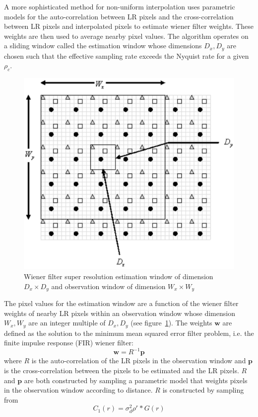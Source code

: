 A more sophisticated method for non-uniform interpolation uses parametric models for the auto-correlation between LR pixels and the cross-correlation between LR pixels and interpolated pixels to estimate wiener filter weights.
%
These weights are then used to average nearby pixel values.
%
The algorithm operates on a sliding window called the estimation window whose dimensions $D_x, D_y$ are chosen such that the effective sampling rate exceeds the Nyquist rate for a given $\rho_c$.
\begin{figure}
    \centering
    \includegraphics[width=.7\linewidth]{figures/wiener.png}
    \caption{Wiener filter super resolution estimation window of dimension $D_x \times D_y$ and observation window of dimension $W_x \times W_y$\cite{wiener}}
    \label{fig:wiener}
\end{figure}
The pixel values for the estimation window are a function of the wiener filter weights of nearby LR pixels within an observation window whose dimension $W_x, W_y$ are an integer multiple of $D_x, D_y$ (see figure~\ref{fig:wiener}).
%
The weights $\bm{w}$ are defined as the solution to the minimum mean squared error filter problem, i.e. the finite impulse response (FIR) wiener filter:
\begin{equation}
    \bm{w} = R^{-1}\bm{p}
\end{equation}
where $R$ is the auto-correlation of the LR pixels in the observation window and $\bm{p}$ is the cross-correlation between the pixels to be estimated and the LR pixels.
%
$R$ and $\bm{p}$ are both constructed by sampling a parametric model that weights pixels in the observation window according to distance.
%
$R$ is constructed by sampling from
\begin{equation}
    C_1(r) = \sigma_{d}^2 \rho^{r} \ast G(r)
\end{equation}
